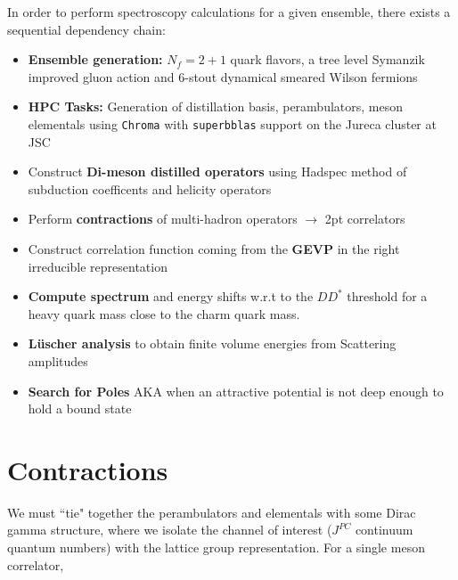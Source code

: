 In order to perform spectroscopy calculations for a given ensemble, there exists a sequential dependency chain:
\begin{itemize}
     \setlength\itemsep{1em}
        \item[\checkmark] \textbf{Ensemble generation:} $N_f = 2+1$ quark flavors, a tree level Symanzik improved gluon action and 6-stout dynamical smeared Wilson fermions
        \item[\checkmark] \textbf{HPC Tasks:} Generation of distillation basis, perambulators, meson elementals using \texttt{Chroma} with \texttt{superbblas} support on the Jureca cluster at JSC
        \item Construct \textbf{Di-meson distilled operators} using Hadspec method of subduction coefficents and helicity operators
        \item[\checkmark] Perform \textbf{contractions} of multi-hadron operators $\to$ 2pt correlators
        \item Construct correlation function coming from the \textbf{GEVP} in the right irreducible representation
        \item \textbf{Compute spectrum} and energy shifts w.r.t to the $DD^*$ threshold for a heavy quark mass close to the charm quark mass.
        \item \textbf{L\"uscher analysis} to obtain finite volume energies from Scattering amplitudes
        \item \textbf{Search for Poles} AKA when an attractive potential is not deep enough to hold a bound state
    \end{itemize}

  \section{Contractions}
  We must ``tie" together the perambulators and elementals with some Dirac gamma structure, where we isolate the channel of interest ($J^{PC}$ continuum quantum numbers) with the lattice group representation. For a single meson correlator, \\ 

